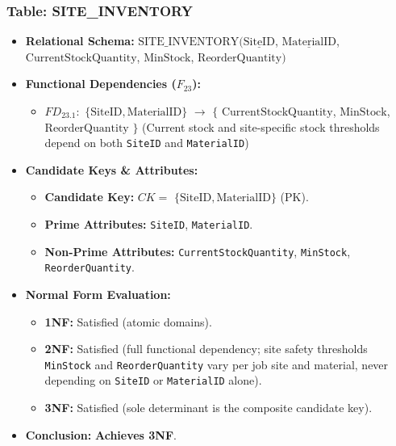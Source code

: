 \documentclass[a4paper,12pt]{report}
\providecommand{\tightlist}{%
  \setlength{\itemsep}{0pt}\setlength{\parskip}{0pt}}
\begin{document}
\subsubsection{\texorpdfstring{Table: SITE\_\allowbreak{}INVENTORY}{Table: SITEINVENTORY}}\label{table-site_inventory}

\begin{itemize}
\item
  \textbf{Relational Schema:} \(\text{SITE\_INVENTORY}(\underline{\text{SiteID}}\), \(\underline{\text{MaterialID}}\), \(\text{CurrentStockQuantity}\), \(\text{MinStock}\), \(\text{ReorderQuantity})\)
\item
  \textbf{Functional Dependencies (\(F_{23}\)):}

  \begin{itemize}
  \tightlist
  \item
    \(FD_{23.1}:\) \(\{\text{SiteID}, \text{MaterialID}\}\) \(\rightarrow\) \(\{\) \(\text{CurrentStockQuantity}\), \(\text{MinStock}\), \(\text{ReorderQuantity}\) \(\}\) (Current stock and site-specific stock thresholds depend on both \texttt{SiteID} and \texttt{MaterialID})
  \end{itemize}
\item
  \textbf{Candidate Keys \& Attributes:}

  \begin{itemize}
  \item
    \textbf{Candidate Key:} \(CK =\) \(\{\text{SiteID}, \text{MaterialID}\}\) (PK).
  \item
    \textbf{Prime Attributes:} \texttt{SiteID}, \texttt{MaterialID}.
  \item
    \textbf{Non-Prime Attributes:} \texttt{CurrentStockQuantity}, \texttt{MinStock}, \texttt{ReorderQuantity}.
  \end{itemize}
\item
  \textbf{Normal Form Evaluation:}

  \begin{itemize}
  \item
    \textbf{1NF:} Satisfied (atomic domains).
  \item
    \textbf{2NF:} Satisfied (full functional dependency; site safety thresholds \texttt{MinStock} and \texttt{ReorderQuantity} vary per job site and material, never depending on \texttt{SiteID} or \texttt{MaterialID} alone).
  \item
    \textbf{3NF:} Satisfied (sole determinant is the composite candidate key).
  \end{itemize}
\item
  \textbf{Conclusion:} \textbf{Achieves 3NF}.
\end{itemize}
\end{document}
